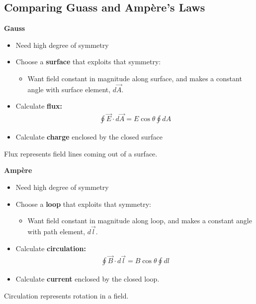 \documentclass[aspectratio=169,
hyperref={colorlinks,urlcolor=blue}
]{beamer}
\begin{document}
\subsection{Comparing Guass and Ampère's Laws}
\label{subsec:comparinggaussandampereslaws}
{
\textbf{Gauss}
\begin{itemize}
\item Need high degree of symmetry
\item Choose a \textbf{surface} that exploits that symmetry:
\begin{itemize}
\item Want field constant in magnitude along surface, and makes a constant angle with surface element, $d\vec A$.
\end{itemize}
\item Calculate \textbf{flux:}
\begin{align*}
\oint \vec E \cdot d\vec A = E\cos\theta\oint dA
\end{align*}
\item Calculate \textbf{charge} enclosed by the closed surface
\end{itemize}
Flux represents field lines coming out of a surface.
}
{
\textbf{Ampère}
\begin{itemize}
\item Need high degree of symmetry
\item Choose a \textbf{loop} that exploits that symmetry:
\begin{itemize}
\item Want field constant in magnitude along loop, and makes a constant angle with path element, $d\vec l$.
\end{itemize}
\item Calculate \textbf{circulation:}
\begin{align*}
\oint \vec B \cdot d\vec l = B\cos\theta\oint dl
\end{align*}
\item Calculate \textbf{current} enclosed by the closed loop.
\end{itemize}
Circulation represents rotation in a field.
}





\end{document}
